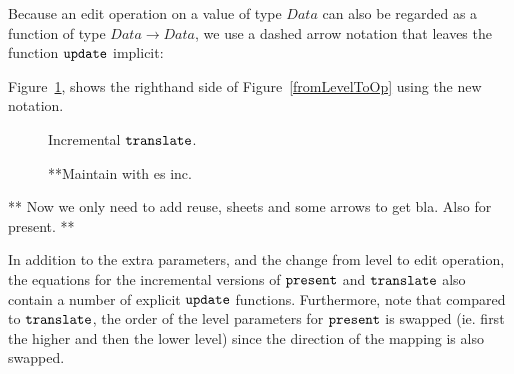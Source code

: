 
\smallskip
Because an edit operation on a value of type $Data$ can also be regarded as a function of type 
$Data \rightarrow Data$, we use a dashed arrow notation that leaves the function ${\tt update}$ implicit:\\


Figure~\ref{incrementalTranslate}, shows the righthand side of Figure~\ref{fromLevelToOp} using the new notation.

\begin{figure}
\begin{small}
\begin{center}
\begin{center}
\end{center}\caption{Incremental ${\tt translate}$.}\label{incrementalTranslate} 
\end{center}
\end{small}
\end{figure}

\begin{figure}
\begin{center}
\begin{center}
\end{center}
\caption{**Maintain with es inc.}\label{layerExtraStateInc} 
\end{center}
\end{figure}

**
Now we only need to add reuse, sheets and some arrows to get bla. Also for present.
**


In addition to the extra parameters, and the change from level to edit operation, the equations for the incremental versions of ${\tt present}$ and ${\tt translate}$ also contain a number of explicit ${\tt update}$ functions. Furthermore, note that compared to ${\tt translate}$, the order of the level parameters for         ${\tt present}$ is swapped (ie. first the higher and then the lower level) since the direction of the mapping is also swapped.
 

